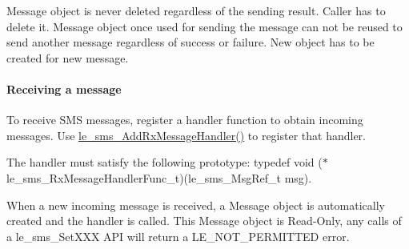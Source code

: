 Message object is never deleted regardless of the sending result. Caller has to delete it. Message object once used for sending the message can not be reused to send another message regardless of success or failure. New object has to be created for new message.\hypertarget{c_sms_le_sms_ops_receiving}{}\paragraph{Receiving a message}\label{c_sms_le_sms_ops_receiving}
To receive S\+MS messages, register a handler function to obtain incoming messages. Use {\ttfamily \hyperlink{le__sms__interface_8h_a844d595f3ae8d170b2fff80d854abb8d}{le\+\_\+sms\+\_\+\+Add\+Rx\+Message\+Handler()}} to register that handler.

The handler must satisfy the following prototype\+: {\ttfamily typedef} void ($\ast$le\+\_\+sms\+\_\+\+Rx\+Message\+Handler\+Func\+\_\+t)(le\+\_\+sms\+\_\+\+Msg\+Ref\+\_\+t msg).

When a new incoming message is received, a Message object is automatically created and the handler is called. This Message object is Read-\/\+Only, any calls of a le\+\_\+sms\+\_\+\+Set\+X\+XX A\+PI will return a L\+E\+\_\+\+N\+O\+T\+\_\+\+P\+E\+R\+M\+I\+T\+T\+ED error.

